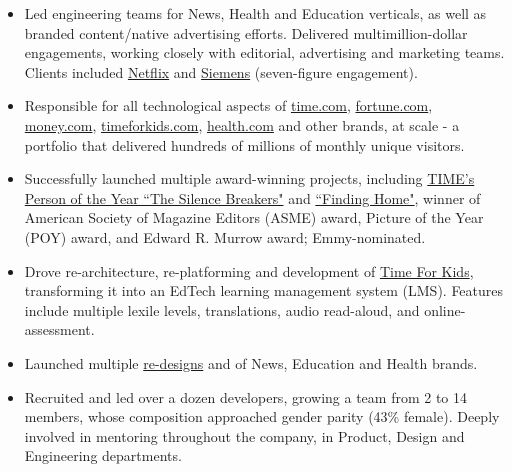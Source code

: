 \documentclass[a4paper,10pt]{memoir} %
\begin{document}
\Sep %


\begin{itemize}
	\item Led engineering teams for News, Health and Education verticals, as well as branded content/native advertising efforts. Delivered multimillion-dollar engagements, working closely with editorial, advertising and marketing teams. Clients included \href{http://time.com/paid-content-from/netflix/dinnertime/}{Netflix} and \href{http://time.com/partner/siemens/innovation-starts-here/}{Siemens} (seven-figure engagement).

	\item Responsible for all technological aspects of \href{http://time.com}{time.com}, \href{http://fortune.com}{fortune.com}, \href{http://money.com}{money.com}, \href{https://www.timeforkids.com}{timeforkids.com}, \href{https://www.health.com}{health.com} and other brands, at scale - a portfolio that delivered hundreds of millions of monthly unique visitors.

	\item Successfully launched multiple award-winning projects, including  \href{http://time.com/time-person-of-the-year-2017-silence-breakers/}{TIME's Person of the Year ``The Silence Breakers"} and \href{http://time.com/finding-home/}{``Finding Home"}, winner of American Society of Magazine Editors (ASME) award, Picture of the Year (POY) award, and Edward R. Murrow award; Emmy-nominated.

	\item Drove re-architecture, re-platforming and development of \href{https://www.timeforkids}{Time For Kids}, transforming it into an EdTech learning management system (LMS). Features include multiple lexile levels, translations, audio read-aloud, and online-assessment.

	\item Launched multiple  \href{https://medium.com/@acharalambides/element-the-digital-unification-of-time-inc-979656149fd3}{re-designs} and of News, Education and Health brands.

	\item Recruited and led over a dozen developers, growing a team from 2 to 14 members, whose composition approached gender parity (43\% female). Deeply involved in mentoring throughout the company, in Product, Design and Engineering departments. 
\end{itemize}
\Sep %
\end{document}
